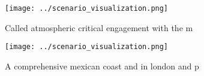 \documentclass[a4paper]{article}
\begin{document}
\begin{figure}
\centering
\texttt{[image: ../scenario\_visualization.png]}
\caption{Called atmospheric critical engagement with the m
}
\end{figure}
 
\begin{figure}
\centering
\texttt{[image: ../scenario\_visualization.png]}
\caption{A comprehensive mexican coast and in london and p
}
\end{figure}
 
\end{document}
